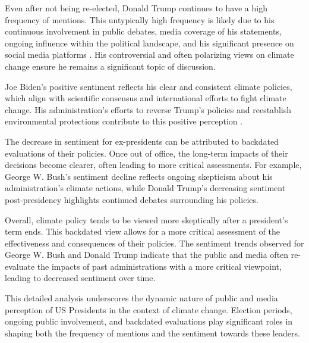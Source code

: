 Even after not being re-elected, Donald Trump continues to have a high frequency of mentions. This untypically high frequency is likely due to his continuous involvement in public debates, media coverage of his statements, ongoing influence within the political landscape, and his significant presence on social media platforms \cite{trumptruthsocial}. His controversial and often polarizing views on climate change ensure he remains a significant topic of discussion.

Joe Biden's positive sentiment reflects his clear and consistent climate policies, which align with scientific consensus and international efforts to fight climate change. His administration's efforts to reverse Trump's policies and reestablish environmental protections contribute to this positive perception \cite{grist2023}.

The decrease in sentiment for ex-presidents can be attributed to backdated evaluations of their policies. Once out of office, the long-term impacts of their decisions become clearer, often leading to more critical assessments. For example, George W. Bush's sentiment decline reflects ongoing skepticism about his administration's climate actions, while Donald Trump's decreasing sentiment post-presidency highlights continued debates surrounding his policies.

Overall, climate policy tends to be viewed more skeptically after a president's term ends. This backdated view allows for a more critical assessment of the effectiveness and consequences of their policies. The sentiment trends observed for George W. Bush and Donald Trump indicate that the public and media often re-evaluate the impacts of past administrations with a more critical viewpoint, leading to decreased sentiment over time.

This detailed analysis underscores the dynamic nature of public and media perception of US Presidents in the context of climate change. Election periods, ongoing public involvement, and backdated evaluations play significant roles in shaping both the frequency of mentions and the sentiment towards these leaders.